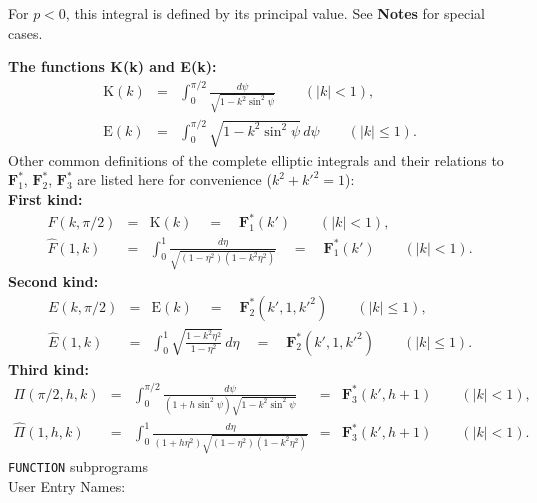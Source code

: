 For $p < 0$, this integral is defined by its principal value.
See {\bf Notes} for special cases.
\par
{\bf The functions K(k) and E(k):}
\begin{eqnarray*}
\mathrm{K}(k) & = & \displaystyle \int_0^{\pi/2}
\frac{d\psi}{\sqrt{1-k^2\sin^2 \psi}} \qquad (|k| < 1), \\
\mathrm{E}(k) & = & \displaystyle \int_0^{\pi/2}
\sqrt{1-k^2\sin^2 \psi} \, d\psi \qquad (|k| \le 1).
\end{eqnarray*}
\newpage
Other common definitions of the complete elliptic integrals and their
relations to $\mathbf{F}_1^*$, $\mathbf{F}_2^*$, $\mathbf{F}_3^*$ are
listed here for convenience ($k^2+{k'}^2 = 1$): \\[2mm]
{\bf First kind:}
$$ \begin{array}{rcl}
F(k,\pi/2) & = & \mathrm{K}(k) \quad = \quad \mathbf{F}_1^*(k') \qquad
(|k| < 1), \\[6mm]
\widehat{F}(1,k) & = & \displaystyle \int_0^1
\frac{d\eta}{\sqrt{(1-\eta^2)(1-k^2\eta^2)}} \quad = \quad
\mathbf{F}_1^*(k') \qquad (|k| < 1).
\end{array} $$
{\bf Second kind:}
$$ \begin{array}{rcl}
E(k,\pi/2) & = & \mathrm{E}(k) \quad = \quad \mathbf{F}_2^*(k',1,{k'}^2)
\qquad (|k| \le 1), \\[6mm]
\widehat{E}(1,k) & = & \displaystyle \int_0^1
\sqrt{\frac{1-k^2 \eta^2}{1-\eta^2}} \, d\eta \quad = \quad
\mathbf{F}_2^*(k',1,{k'}^2) \qquad (|k| \le 1).
\end{array} $$
{\bf Third kind:}
$$ \begin{array}{rclcl}
\Pi(\pi/2,h,k) & = & \displaystyle \int_0^{\pi/2}
\frac{d\psi}{(1+h\sin^2 \psi)\sqrt{1-k^2\sin^2 \psi}} & = &
\mathbf{F}_3^*(k',h+1) \qquad (|k| < 1), \\[6mm]
\widehat{\Pi}(1,h,k) & = & \displaystyle \int_0^1
\frac{d\eta}{(1+h\eta^2)\sqrt{(1-\eta^2)(1-k^2\eta^2)}} & = &
\mathbf{F}_3^*(k',h+1) \qquad (|k| < 1).
\end{array} $$
\Structure
{\tt FUNCTION} subprograms \\
User Entry Names:
